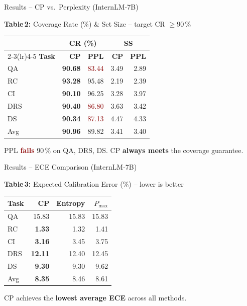 \documentclass{beamer}
\newcommand{\hrow}{\rowcolor{hlblue}}
\begin{document}
\begin{frame}{Results -- CP vs.\ Perplexity (InternLM-7B)}

\begin{block}{\textbf{Table\,2:} Coverage Rate (\%) \& Set Size -- target CR $\geq90\,\%$}
\small
\renewcommand{\arraystretch}{1.18}
\begin{center}
\begin{tabular}{lrrrr}
\toprule
 & \multicolumn{2}{c}{\textbf{CR (\%)}} & \multicolumn{2}{c}{\textbf{SS}} \\
\cmidrule(lr){2-3}\cmidrule(lr){4-5}
\textbf{Task} & \textbf{CP} & \textbf{PPL} & \textbf{CP} & \textbf{PPL} \\
\midrule
QA  & \textbf{90.68} & \textcolor{darkred}{83.44} & 3.49 & 2.89 \\
RC  & \textbf{93.28} & 95.48 & 2.19 & 2.39 \\
CI  & \textbf{90.10} & 96.25 & 3.28 & 3.97 \\
DRS & \textbf{90.40} & \textcolor{darkred}{86.80} & 3.63 & 3.42 \\
DS  & \textbf{90.34} & \textcolor{darkred}{87.13} & 4.47 & 4.33 \\
\midrule
Avg & \textbf{90.96} & 89.82 & 3.41 & 3.40 \\
\bottomrule
\end{tabular}
\end{center}
PPL \textcolor{darkred}{\textbf{fails}} 90\,\% on QA, DRS, DS.\quad
CP \textbf{always meets} the coverage guarantee.
\end{block}

\end{frame}

\begin{frame}{Results -- ECE Comparison (InternLM-7B)}

\begin{block}{\textbf{Table\,3:} Expected Calibration Error (\%) -- lower is better}
\small
\renewcommand{\arraystretch}{1.18}
\begin{center}
\begin{tabular}{lrrr}
\toprule
\textbf{Task} & \textbf{CP} & \textbf{Entropy} & \textbf{$P_{\max}$} \\
\midrule
QA  & 15.83 & 15.83 & 15.83 \\
RC  & \textbf{1.33}  & 1.32  & 1.41  \\
CI  & \textbf{3.16}  & 3.45  & 3.75  \\
DRS & \textbf{12.11} & 12.40 & 12.45 \\
DS  & \textbf{9.30}  & 9.30  & 9.62  \\
\midrule
\hrow Avg & \textbf{8.35} & 8.46 & 8.61 \\
\bottomrule
\end{tabular}
\end{center}
CP achieves the \textbf{lowest average ECE} across all methods.
\end{block}

\end{frame}
\end{document}
